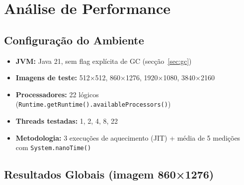 \documentclass[a4paper,11pt,openright,BCOR=15mm]{scrbook}
\begin{document}
\chapter{Análise de Performance}

\section{Configuração do Ambiente}

\begin{itemize}
    \item \textbf{JVM:} Java 21, sem flag explícita de GC (secção~\ref{sec:gc})
    \item \textbf{Imagens de teste:} 512×512, 860×1276, 1920×1080, 3840×2160
    \item \textbf{Processadores:} 22 lógicos (\texttt{Runtime.getRuntime().availableProcessors()})
    \item \textbf{Threads testadas:} 1, 2, 4, 8, 22
    \item \textbf{Metodologia:} 3 execuções de aquecimento (JIT) + média de 5 medições com \texttt{System.nanoTime()}
\end{itemize}

\section{Resultados Globais (imagem 860×1276)}
\end{document}
